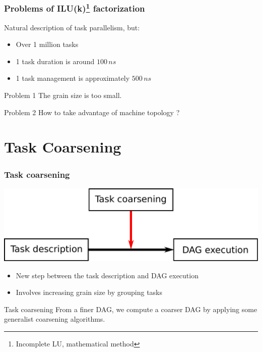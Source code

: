 \documentclass{beamer}
\begin{document}
\begin{frame}
  \frametitle{Problems of ILU(k)\footnote{Incomplete LU, mathematical method} factorization}
  
  Natural description of task parallelism, but:
  \begin{itemize}
   	\item Over 1 million tasks
   	\item 1 task duration is around $100\,ns$
   	\item 1 task management is approximately $500\,ns$
  \end{itemize}
  
  \begin{alertblock}{Problem 1}
    The grain size is too small.
  \end{alertblock}
  
  \begin{alertblock}{Problem 2}
    How to take advantage of machine topology ?
  \end{alertblock}
\end{frame}


  
  

\section{Task Coarsening}
\begin{frame}
  \frametitle{Task coarsening}

  \centerline{\includegraphics[width=0.80\linewidth]{insert}}

  \begin{itemize}
    \item New step between the task description and DAG execution
    \item Involves increasing grain size by grouping tasks
  \end{itemize}
  
  \begin{block}{Task coarsening}
    From a finer DAG, we compute a coarser DAG by applying
    some generalist coarsening algorithms.
  \end{block}
\end{frame}
\end{document}
